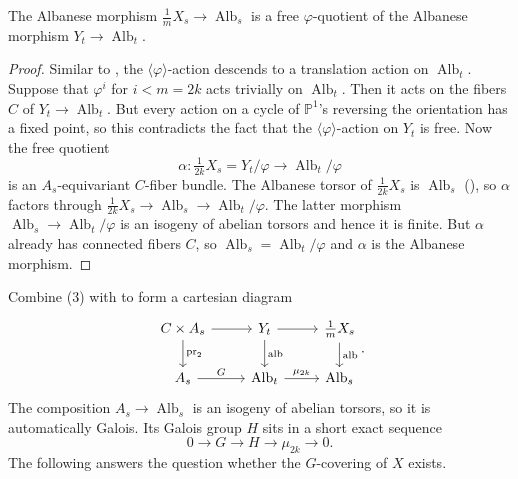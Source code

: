 \documentclass[reqno, letterpaper]{amsart}
\numberwithin{equation}{subsection}
\let\to\longrightarrow
\newcommand{\PP}{\mathbb{P}}
\DeclareMathOperator{\pr}{pr}
\DeclareMathOperator{\Alb}{Alb}
\DeclareMathOperator{\alb}{alb}
\begin{document}
			\begin{lemma} \label{lem:Albanese of X is quotient of Albanese of Y}
				The Albanese morphism $\frac{1}{m}X_s \to \Alb_s$ is a free $\varphi$-quotient of the Albanese morphism $Y_t \to \Alb_t$.
			\end{lemma}
			\begin{proof}
				Similar to , the $\langle \varphi \rangle$-action descends to a translation action on $\Alb_t$. Suppose that $\varphi^i$ for $i < m = 2k$ acts trivially on $\Alb_t$. Then it acts on the fibers $C$ of $Y_t \to \Alb_t$. But every action on a cycle of $\PP^1$'s reversing the orientation has a fixed point, so this contradicts the fact that the $\langle \varphi \rangle$-action on $Y_t$ is free. Now the free quotient
				\[ \alpha : \tfrac{1}{2k} X_s = Y_t/\varphi \to \Alb_t/\varphi \]
				is an $A_s$-equivariant $C$-fiber bundle. The Albanese torsor of $\frac{1}{2k}X_s$ is $\Alb_s$ (), so $\alpha$ factors through $\frac{1}{2k}X_s \to \Alb_s \to \Alb_t/\varphi$. The latter morphism $\Alb_s \to \Alb_t/\varphi$ is an isogeny of abelian torsors and hence it is finite. But $\alpha$ already has connected fibers $C$, so $\Alb_s = \Alb_t/\varphi$ and $\alpha$ is the Albanese morphism.
			\end{proof}
			
			Combine (3) with  to form a cartesian diagram
			\[\begin{tikzcd}
				C \times A_s \arrow[r] \arrow[d, "\pr_2"] & Y_t \arrow[r] \arrow[d, "\alb"] & \tfrac{1}{m} X_s \arrow[d, "\alb"] \\
				A_s \arrow[r, "G"] & \Alb_t \arrow[r, "\mu_{2k}"] & \Alb_s
			\end{tikzcd}.\]
			The composition $A_s \to \Alb_s$ is an isogeny of abelian torsors, so it is automatically Galois. Its Galois group $H$ sits in a short exact sequence
			\begin{equation} \label{eq:multiple fiber iv:ses of H}
				0 \to G \to H \to \mu_{2k} \to 0 .
			\end{equation}
			The following answers the question whether the $G$-covering of $X$ exists.
			
\end{document}
